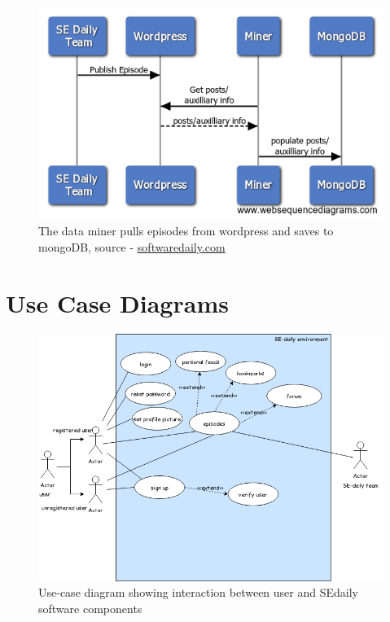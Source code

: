 \documentclass{article}
\begin{document}
\begin{figure}[h]
  \centering
  \includegraphics[width=.7\linewidth]{img/data_miner.png}
  \caption{The data miner pulls episodes from wordpress and saves to mongoDB, source - \href{https://www.softwaredaily.com/}{softwaredaily.com}}
\end{figure}
\pagebreak

\section{Use Case Diagrams}
\begin{figure}[h]
  \centering
  \includegraphics[width=.9\linewidth]{img/use_case.png}
  \caption{Use-case diagram showing interaction between user and SEdaily software components}
\end{figure}

\pagebreak

\end{document}
